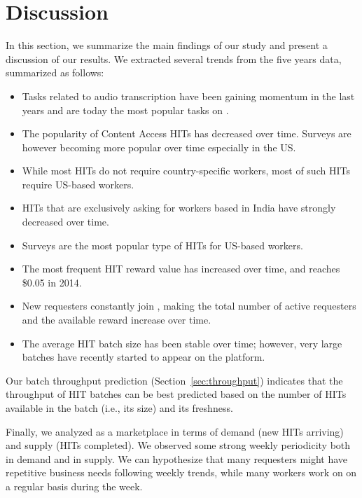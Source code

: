 \section{Discussion}
\label{sec:discuss}

In this section, we summarize the main findings of our study and present a discussion of our results. We  extracted several trends from the five years data, summarized as follows:
\begin{itemize}[noitemsep,topsep=0pt,parsep=0pt,partopsep=0pt]
	\item Tasks related to audio transcription have been gaining momentum in the last years and are today the most popular tasks on \amt{}.
	\item The popularity of Content Access HITs has decreased over time. Surveys are however becoming more popular over time especially in the US.
	\item While most HITs do not require country-specific workers, most of such HITs require US-based workers.
	\item HITs that are exclusively asking for workers based in India have strongly decreased over time.
	\item Surveys are the most popular type of HITs for US-based workers.
	\item The most frequent HIT reward value has increased over time, and reaches \$0.05 in 2014.
	\item New requesters constantly join \amt{}, making the total number of active requesters and the available reward increase over time.
	\item The average HIT batch size has been stable over time; however, very large batches have recently started to appear on the platform.
\end{itemize}

Our batch throughput prediction (Section~\ref{sec:throughput}) indicates that the throughput of HIT batches can be best predicted based on the number of HITs available in the batch (i.e., its size) and its freshness.

Finally, we analyzed \amt{} as a marketplace in terms of demand (new HITs arriving) and supply (HITs completed). 
We observed some strong weekly periodicity both in demand and in supply. We can hypothesize that many requesters might have repetitive business needs following weekly trends, while many workers work on \amt{} on a regular basis during the week.